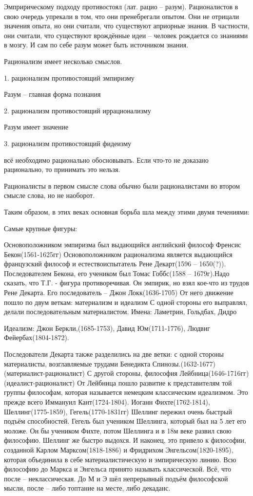 Эмпририческому подходу противостоял (лат. рацио – разум). Рационалистов в свою очередь упрекали в том, что они пренебрегали опытом. Они не отрицали значения опыта, но они считали, что существуют априорные знания. В частности, они считали, что существуют врождённые идеи – человек рождается со знаниями в мозгу. И сам по себе разум может быть источником знания.

Рационализм имеет несколько смыслов.

1. рационализм противостоящий эмпиризму

    Разум – главная форма познания

2. рационализм противостоящий иррационализму

Разум имеет значение

3. рационализм противостоящий фидеизму

всё необходимо рационально обосновывать. Если что-то не доказано рационально, то 	принимать это нельзя. 

Рационалисты в первом смысле слова обычно были рационалистами во втором смысле слова, но не наоборот.

Таким образом, в этих веках основная борьба шла между этими двумя течениями:

Самые крупные фигуры:

Основоположником эмпиризма был выдающийся английский философ Френсис Бекон(1561-1625гг) Основоположником рационализма является выдающийся французский философ и естествоиспытатель Рене Декарт(1596 – 1650(?)). Последователем Бекона, его учеником был Томас Гоббс(1588 – 1679г).Надо сказать, что Т.Г. - фигура противоречивая. Он эмпирик, но взял кое-что из трудов Рене Декарта. Его последователь – Джон Локк(1636-1705) От него движение пошло по двум веткам: материализм и идеализм С одной стороны его выправлял, делали последовательным материалистом. Имена: Ламетрин, Гольдбах, Дидро

Идеализм: Джон Беркли,(1685-1753), Давид Юм(1711-1776), Людвиг Фейербах(1804-1872).

Последователи Декарта также разделились на две ветки: с одной стороны материалисты, возглавляемые трудами Бенедикта Спинозы.(1632-1677) (материалист-рационалист) С другой стороны, философия Лейбница(1646-1716гг) (идеалист-рационалист) От Лейбница пошло развитие к представителям той группы философам, которая называется немецким классическим идеализмом. Это прежде всего Иммануил Кант(1724-1804). Иоганн Фихте(1762-1814), Шеллинг(1775-1859), Гегель(1770-1831гг) Шеллинг пережил очень быстрый подъём способностей. Гегель был учеником Шеллинга, который был на 5 лет его моложе. Он бы учеником Фихте, потом Шеллинга и в 18м веке развил свою философию. Шеллинг же быстро выдохся. И наконец, это привело к философии, созданной Карлом Марксом(1818-1886) и Фридрихом Энгельсом(1820-1895), которая объединила в себе материалистическую и эмпирическую линию. Всю философию до Маркса и Энгельса принято называть классической. Всё, что после – неклассическая. До М и Э шёл непрерывный подъём философской мысли, после – либо топтание на месте, либо декаданс.
